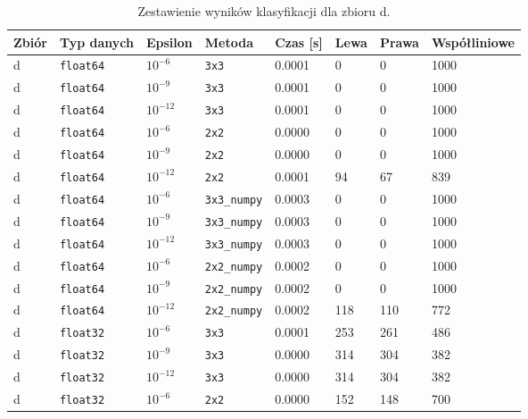 \documentclass[11pt,a4paper]{article}
\begin{document}
\begin{table}[htbp]
    \centering
    \caption{Zestawienie wyników klasyfikacji dla zbioru d.}
    \label{tab:wyniki_d_all}
    \begin{tabular}{llllllll}
        \toprule
        Zbiór & Typ danych & Epsilon & Metoda & Czas [s] & Lewa & Prawa & Współliniowe \\
        \midrule
        d & \texttt{float64} & $10^{-6}$  & \texttt{3x3}        & 0.0001 & 0   & 0   & 1000 \\
        d & \texttt{float64} & $10^{-9}$  & \texttt{3x3}        & 0.0001 & 0   & 0   & 1000 \\
        d & \texttt{float64} & $10^{-12}$ & \texttt{3x3}        & 0.0001 & 0   & 0   & 1000 \\
        \midrule
        d & \texttt{float64} & $10^{-6}$  & \texttt{2x2}        & 0.0000 & 0   & 0   & 1000 \\
        d & \texttt{float64} & $10^{-9}$  & \texttt{2x2}        & 0.0000 & 0   & 0   & 1000 \\
        d & \texttt{float64} & $10^{-12}$ & \texttt{2x2}        & 0.0001 & 94  & 67  & 839  \\
        \midrule
        d & \texttt{float64} & $10^{-6}$  & \texttt{3x3\_numpy} & 0.0003 & 0   & 0   & 1000 \\
        d & \texttt{float64} & $10^{-9}$  & \texttt{3x3\_numpy} & 0.0003 & 0   & 0   & 1000 \\
        d & \texttt{float64} & $10^{-12}$ & \texttt{3x3\_numpy} & 0.0003 & 0   & 0   & 1000 \\
        \midrule
        d & \texttt{float64} & $10^{-6}$  & \texttt{2x2\_numpy} & 0.0002 & 0   & 0   & 1000 \\
        d & \texttt{float64} & $10^{-9}$  & \texttt{2x2\_numpy} & 0.0002 & 0   & 0   & 1000 \\
        d & \texttt{float64} & $10^{-12}$ & \texttt{2x2\_numpy} & 0.0002 & 118 & 110 & 772  \\
        \midrule
        d & \texttt{float32} & $10^{-6}$  & \texttt{3x3}        & 0.0001 & 253 & 261 & 486  \\
        d & \texttt{float32} & $10^{-9}$  & \texttt{3x3}        & 0.0000 & 314 & 304 & 382  \\
        d & \texttt{float32} & $10^{-12}$ & \texttt{3x3}        & 0.0000 & 314 & 304 & 382  \\
        \midrule
        d & \texttt{float32} & $10^{-6}$  & \texttt{2x2}        & 0.0000 & 152 & 148 & 700  \\

\end{tabular}
\end{table}
\end{document}
